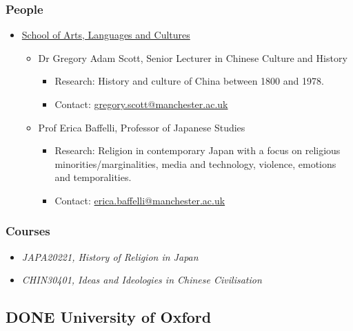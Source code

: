 \documentclass[11pt]{article}
\begin{document}
\subsubsection*{People}
\label{sec:org079d1a5}
\begin{itemize}
\item \href{https://www.research.manchester.ac.uk/portal/en/facultiesandschools/school-of-arts-languages-and-cultures(67be616e-b627-4747-a791-872e7594dfc1).html}{School of Arts, Languages and Cultures}
\label{sec:org9ef10f1}
\begin{itemize}
\item Dr Gregory Adam Scott, Senior Lecturer in Chinese Culture and History
\label{sec:org4fe7dc1}
\begin{itemize}
\item Research: History and culture of China between 1800 and 1978.\\
\item Contact: \href{mailto:gregory.scott@manchester.ac.uk}{gregory.scott@manchester.ac.uk}\\
\end{itemize}
\item Prof Erica Baffelli, Professor of Japanese Studies
\label{sec:orged66799}
\begin{itemize}
\item Research: Religion in contemporary Japan with a focus on religious minorities/marginalities, media and technology, violence, emotions and temporalities.\\
\item Contact: \href{mailto:erica.baffelli@manchester.ac.uk}{erica.baffelli@manchester.ac.uk}\\
\end{itemize}
\end{itemize}
\end{itemize}
\subsubsection*{Courses}
\label{sec:org0b9fcdc}
\begin{itemize}
\item \emph{JAPA20221, History of Religion in Japan}\\
\item \emph{CHIN30401, Ideas and Ideologies in Chinese Civilisation}\\
\end{itemize}
\subsection*{{\bfseries\sffamily DONE} University of Oxford}
\label{sec:orgb7bd25d}
\end{document}
